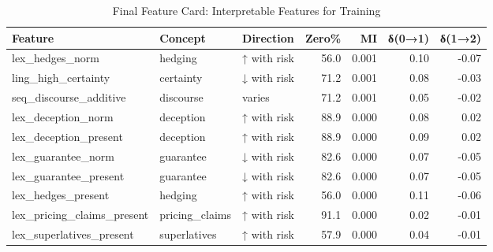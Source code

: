 \begin{table}[htbp]
\centering
\caption{Final Feature Card: Interpretable Features for Training}
\label{tab:feature_card}
\begin{tabular}{lllrrrr}
\toprule
Feature & Concept & Direction & Zero\% & MI & δ(0→1) & δ(1→2) \\
\midrule
lex\_hedges\_norm & hedging & ↑ with risk & 56.0 & 0.001 & 0.10 & -0.07 \\
ling\_high\_certainty & certainty & ↓ with risk & 71.2 & 0.001 & 0.08 & -0.03 \\
seq\_discourse\_additive & discourse & varies & 71.2 & 0.001 & 0.05 & -0.02 \\
lex\_deception\_norm & deception & ↑ with risk & 88.9 & 0.000 & 0.08 & 0.02 \\
lex\_deception\_present & deception & ↑ with risk & 88.9 & 0.000 & 0.09 & 0.02 \\
lex\_guarantee\_norm & guarantee & ↓ with risk & 82.6 & 0.000 & 0.07 & -0.05 \\
lex\_guarantee\_present & guarantee & ↓ with risk & 82.6 & 0.000 & 0.07 & -0.05 \\
lex\_hedges\_present & hedging & ↑ with risk & 56.0 & 0.000 & 0.11 & -0.06 \\
lex\_pricing\_claims\_present & pricing\_claims & ↑ with risk & 91.1 & 0.000 & 0.02 & -0.01 \\
lex\_superlatives\_present & superlatives & ↑ with risk & 57.9 & 0.000 & 0.04 & -0.01 \\
\bottomrule
\end{tabular}
\end{table}
